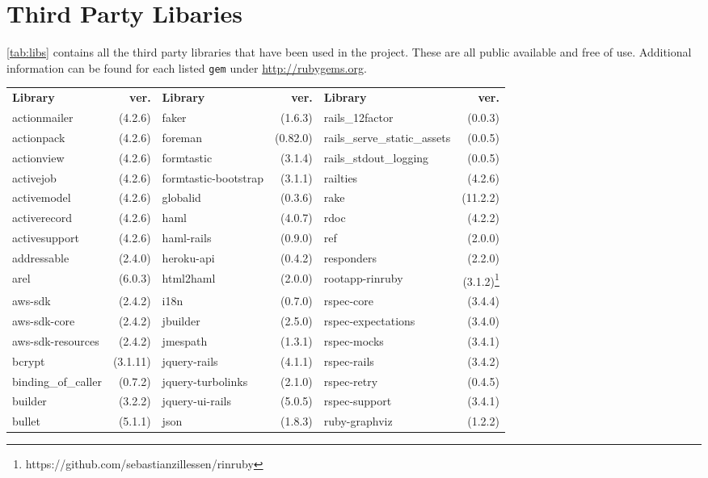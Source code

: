 {}

\section{Third Party Libaries}
\label{app:c}
\label{app:3rdparty}
\autoref{tab:libs} contains all the third party libraries that have been used in the project. These are all public available and free of use. Additional information can be found for each listed \texttt{gem} under \href{http://rubygems.org}{http://rubygems.org}.

\begin{table}[!h]
	\centering
	\begin{tabular}{|p{2.4cm}r||p{2.4cm}r||p{2.4cm}r|}
	\hline
	\textbf{Library} & \textbf{ver.} & 	\textbf{Library} & \textbf{ver.} & 	\textbf{Library} & \textbf{ver.} \\
	actionmailer&(4.2.6)&faker&(1.6.3)&rails\_12factor&(0.0.3)\\
actionpack&(4.2.6)&foreman&(0.82.0)&\tiny{rails\_serve\_static\_assets}&(0.0.5)\\
actionview&(4.2.6)&formtastic&(3.1.4)&\tiny{rails\_stdout\_logging}&(0.0.5)\\
activejob&(4.2.6)&\tiny{formtastic-bootstrap}&(3.1.1)&railties&(4.2.6)\\
activemodel&(4.2.6)&globalid&(0.3.6)&rake&(11.2.2)\\
activerecord&(4.2.6)&haml&(4.0.7)&rdoc&(4.2.2)\\
activesupport&(4.2.6)&haml-rails&(0.9.0)&ref&(2.0.0)\\
addressable&(2.4.0)&heroku-api&(0.4.2)&responders&(2.2.0)\\
arel&(6.0.3)&html2haml&(2.0.0)&\tiny{rootapp-rinruby}&(3.1.2)\footnote{https://github.com/sebastianzillessen/rinruby}\\
aws-sdk&(2.4.2)&i18n&(0.7.0)&rspec-core&(3.4.4)\\
aws-sdk-core&(2.4.2)&jbuilder&(2.5.0)&\tiny{rspec-expectations}&(3.4.0)\\
\tiny{aws-sdk-resources}&(2.4.2)&jmespath&(1.3.1)&rspec-mocks&(3.4.1)\\
bcrypt&(3.1.11)&jquery-rails&(4.1.1)&rspec-rails&(3.4.2)\\
\tiny{binding\_of\_caller}&(0.7.2)&\tiny{jquery-turbolinks}&(2.1.0)&rspec-retry&(0.4.5)\\
builder&(3.2.2)&jquery-ui-rails&(5.0.5)&rspec-support&(3.4.1)\\
bullet&(5.1.1)&json&(1.8.3)&ruby-graphviz&(1.2.2)\\

\end{tabular}
\end{table}
